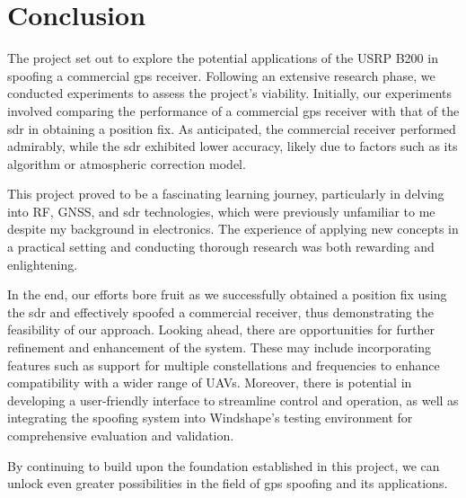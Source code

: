 \chapter*{Conclusion}

The project set out to explore the potential applications of the USRP B200 in spoofing a commercial \gls{gps} receiver. Following an extensive research phase, we conducted experiments to assess the project's viability. Initially, our experiments involved comparing the performance of a commercial \gls{gps} receiver with that of the \gls{sdr} in obtaining a position fix. As anticipated, the commercial receiver performed admirably, while the \gls{sdr} exhibited lower accuracy, likely due to factors such as its algorithm or atmospheric correction model.

This project proved to be a fascinating learning journey, particularly in delving into RF, GNSS, and \gls{sdr} technologies, which were previously unfamiliar to me despite my background in electronics. The experience of applying new concepts in a practical setting and conducting thorough research was both rewarding and enlightening.

In the end, our efforts bore fruit as we successfully obtained a position fix using the \gls{sdr} and effectively spoofed a commercial receiver, thus demonstrating the feasibility of our approach. Looking ahead, there are opportunities for further refinement and enhancement of the system. These may include incorporating features such as support for multiple constellations and frequencies to enhance compatibility with a wider range of UAVs. Moreover, there is potential in developing a user-friendly interface to streamline control and operation, as well as integrating the spoofing system into Windshape's testing environment for comprehensive evaluation and validation.

By continuing to build upon the foundation established in this project, we can unlock even greater possibilities in the field of \gls{gps} spoofing and its applications.

